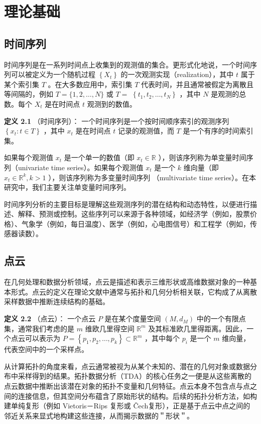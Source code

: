 \section{理论基础}

\subsection{时间序列}
时间序列是在一系列时间点上收集到的观测值的集合。更形式化地说，一个时间序列可以被定义为一个随机过程 $\left\{X_t\right\}$ 的一次观测实现（realization），其中 $t$ 属于某个索引集 $T$ 。在大多数应用中，索引集 $T$ 代表时间，并且通常被假定为离散且等间隔的，例如 $T=\{1,2, \ldots, N\}$ 或 $T=$ $\left\{t_1, t_2, \ldots, t_N\right\}$ ，其中 $N$ 是观测的总数。每个 $X_t$ 是在时间点 $t$ 观测到的数值。

\textbf{定义 2.1} （时间序列）\cite{shumway2000time}：
一个时间序列是一个按时间顺序索引的观测序列 $\left\{x_t: t \in T\right\}$ ，其中 $x_t$ 是在时间点 $t$ 记录的观测值，而 $T$ 是一个有序的时间索引集。

如果每个观测值 $x_t$ 是一个单一的数值（即 $x_t \in \mathbb{R}$ ），则该序列称为单变量时间序列（univariate time series）。如果每个观测值 $x_t$ 是一个 $k$ 维向量（即 $x_t \in \mathbb{R}^k, k>1$ ），则该序列称为多变量时间序列 （multivariate time series）。在本研究中，我们主要关注单变量时间序列。

时间序列分析的主要目标是理解这些观测序列的潜在结构和动态特性，以便进行描述、解释、预测或控制。这些序列可以来源于各种领域，如经济学（例如，股票价格）、气象学（例如，每日温度）、医学（例如，心电图信号）和工程学（例如，传感器读数）。

\subsection{点云}
在几何处理和数据分析领域，点云是描述和表示三维形状或高维数据对象的一种基本形式。点云的定义在理论文献中通常与拓扑和几何分析相关联，它构成了从离散采样数据中推断连续结构的基础。

\textbf{定义 2.2} （点云）\cite{dey2022computational}：
一个点云 $P$ 是在某个度量空间 $\left(M, d_M\right)$ 中的一个有限点集，通常我们考虑的是 $m$ 维欧几里得空间 $\mathbb{R}^m$ 及其标准欧几里得距离。因此，一个点云可以表示为 $P=\left\{p_1, p_2, \ldots, p_k\right\} \subset \mathbb{R}^m$ ，其中每个 $p_i$ 是一个 $m$ 维向量，代表空间中的一个采样点。

从计算拓扑的角度来看，点云通常被视为从某个未知的、潜在的几何对象或数据分布中采样得到的结果。拓扑数据分析（TDA）的核心任务之一便是从这些离散的点云数据中推断出该潜在对象的拓扑不变量和几何特征。点云本身不包含点与点之间的连接信息，但其空间分布蕴含了原始形状的结构。后续的拓扑分析方法，如构建单纯复形（例如 Vietoris－Rips 复形或 Čech复形），正是基于点云中点之间的邻近关系来显式地构建这些连接，从而揭示数据的＂形状＂。


